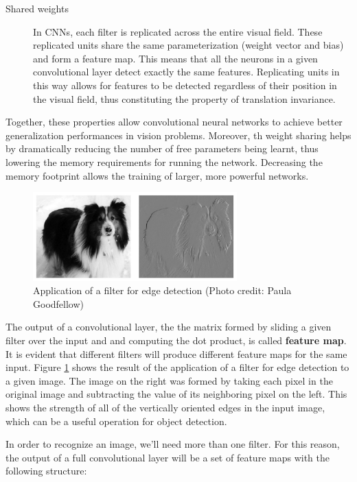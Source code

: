 \begin{description}
	\item[Shared weights] In \acsp{CNN}, each filter is replicated across the entire visual field. These replicated units share the same parameterization (weight vector and bias) and form a feature map. This means that all the neurons in a given convolutional layer detect exactly the same features. Replicating units in this way allows for features to be detected regardless of their position in the visual field, thus constituting the property of translation invariance.
	
\end{description}

Together, these properties allow convolutional neural networks to achieve better generalization performances in vision problems. Moreover, th weight sharing helps by dramatically reducing the number of free parameters being learnt, thus lowering the memory requirements for running the network. Decreasing the memory footprint allows the training of larger, more powerful networks.

\begin{figure}
	\centering
	\includegraphics[width=0.7\textwidth]{Images/filter_application}
	\caption{Application of a filter for edge detection (Photo credit: Paula
		Goodfellow)}\label{fig:filter_application}
\end{figure}

The output of a convolutional layer, \ie the the matrix formed by sliding a given filter over the input and and computing the dot product, is called \textbf{feature map}. It is evident that different filters will produce different feature maps for the same input. Figure \ref{fig:filter_application} shows the result of the application of a filter for edge detection to a given image. The image on the right was formed by taking
each pixel in the original image and subtracting the value of its neighboring pixel on the left. This shows the strength of all of the vertically oriented edges in the input image,
which can be a useful operation for object detection.

In order to recognize an image, we'll need more than one filter. For this reason, the output of a full convolutional layer will be a set of feature maps with the following structure:

